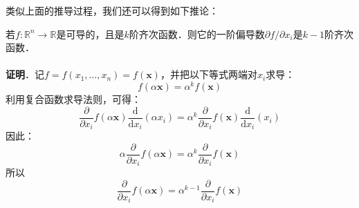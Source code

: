类似上面的推导过程，我们还可以得到如下推论：
\begin{corollary}{}
若$f:\mathbb{R}^n \to \mathbb{R}$是可导的，且是$ k $阶齐次函数．则它的一阶偏导数$\partial f/\partial x_i$是$k-1$阶齐次函数．
\\
\\
\textbf{证明}．记$ f=f(x_{1},\ldots ,x_{n})=f(\mathbf {x} )$，并把以下等式两端对$x_{i}$求导：
\begin{equation}
f(\alpha \mathbf {x} )=\alpha ^{k}f(\mathbf {x} )
\end{equation}
利用复合函数求导法则，可得：
\begin{equation}
\frac {\partial }{\partial x_{i}}f(\alpha \mathbf {x} ){\frac {\mathrm {d} }{\mathrm {d} x_{i}}}(\alpha x_{i})=\alpha ^{k}{\frac {\partial }{\partial x_{i}}}f(\mathbf {x} ){\frac {\mathrm {d} }{\mathrm {d} x_{i}}}(x_{i})
\end{equation}
因此：
\begin{equation}
\alpha {\frac {\partial }{\partial x_{i}}}f(\alpha \mathbf {x} )=\alpha ^{k}{\frac {\partial }{\partial x_{i}}}f(\mathbf {x} )
\end{equation}
所以
\begin{equation}
{\frac {\partial }{\partial x_{i}}}f(\alpha \mathbf {x} )=\alpha ^{k-1}{\frac {\partial }{\partial x_{i}}}f(\mathbf {x} )
\end{equation}
\end{corollary}